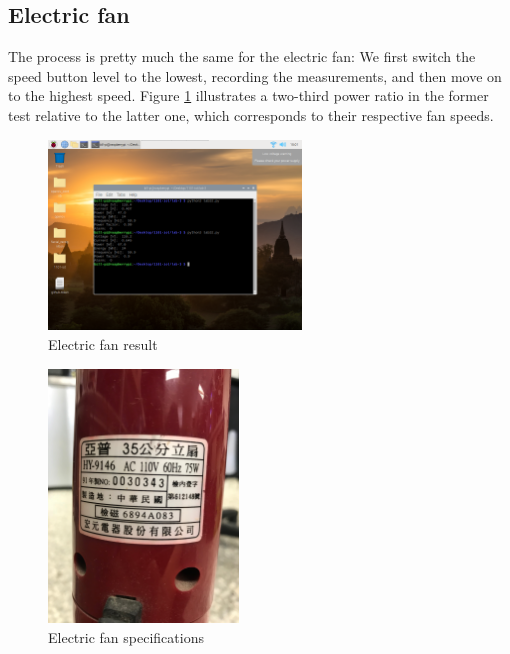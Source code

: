 \documentclass[12pt, a4paper, onside]{article}
\begin{document}
\clearpage

\subsection{Electric fan}
The process is pretty much the same for the electric fan: We first switch the speed button level to the lowest, recording the measurements, and then move on to the highest speed. Figure \ref{electric-fan} illustrates a two-third power ratio in the former test relative to the latter one, which corresponds to their respective fan speeds.
\begin{figure}[h]
  \centering
  \includegraphics[width=0.6\textwidth]{img/2_res_electric_fan_speed_button_low_then_high}
  \caption{Electric fan result}
  \label{electric-fan}
\end{figure}
\begin{figure}[h]
  \centering
  \includegraphics[angle=-90, origin=c, width=0.45\textwidth]{img/2_spe_electric_fan}
  \caption{Electric fan specifications}
\end{figure}
\end{document}
